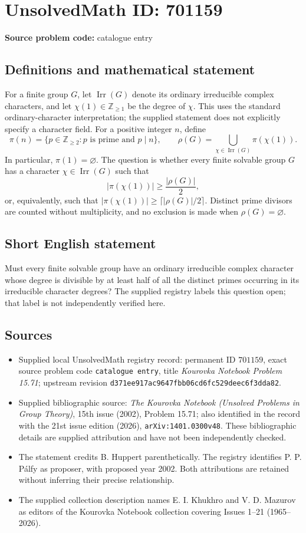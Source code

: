 \documentclass[11pt]{article}
\newcommand{\Z}{\mathbb{Z}}
\begin{document}
\section*{UnsolvedMath ID: 701159}
\textbf{Source problem code:} catalogue entry
\subsection{Definitions and mathematical statement}
For a finite group \(G\), let \(\operatorname{Irr}(G)\) denote its ordinary irreducible complex characters, and let \(\chi(1)\in\Z_{\geq 1}\) be the degree of \(\chi\). This uses the standard ordinary-character interpretation; the supplied statement does not explicitly specify a character field. For a positive integer \(n\), define
\[
\pi(n)=\{p\in\Z_{\geq 2}:p\text{ is prime and }p\mid n\},
\qquad
\rho(G)=\bigcup_{\chi\in\operatorname{Irr}(G)}\pi(\chi(1)).
\]
In particular, \(\pi(1)=\varnothing\). The question is whether every finite solvable group \(G\) has a character \(\chi\in\operatorname{Irr}(G)\) such that
\[
\bigl|\pi(\chi(1))\bigr|\geq\frac{|\rho(G)|}{2},
\]
or, equivalently, such that \(\bigl|\pi(\chi(1))\bigr|\geq\lceil |\rho(G)|/2\rceil\). Distinct prime divisors are counted without multiplicity, and no exclusion is made when \(\rho(G)=\varnothing\).
\subsection{Short English statement}
Must every finite solvable group have an ordinary irreducible complex character whose degree is divisible by at least half of all the distinct primes occurring in its irreducible character degrees? The supplied registry labels this question open; that label is not independently verified here.
\subsection{Sources}
\begin{itemize}
\item Supplied local UnsolvedMath registry record: permanent ID \(701159\), exact source problem code \texttt{catalogue entry}, title \emph{Kourovka Notebook Problem 15.71}; upstream revision \texttt{d371ee917ac9647fbb06cd6fc529deec6f3dda82}.
\item Supplied bibliographic source: \emph{The Kourovka Notebook (Unsolved Problems in Group Theory)}, 15th issue (2002), Problem 15.71; also identified in the record with the 21st issue edition (2026), \texttt{arXiv:1401.0300v48}. These bibliographic details are supplied attribution and have not been independently checked.
\item The statement credits B. Huppert parenthetically. The registry identifies P. P. P\'alfy as proposer, with proposed year 2002. Both attributions are retained without inferring their precise relationship.
\item The supplied collection description names E. I. Khukhro and V. D. Mazurov as editors of the Kourovka Notebook collection covering Issues 1--21 (1965--2026).
\end{itemize}
\end{document}
